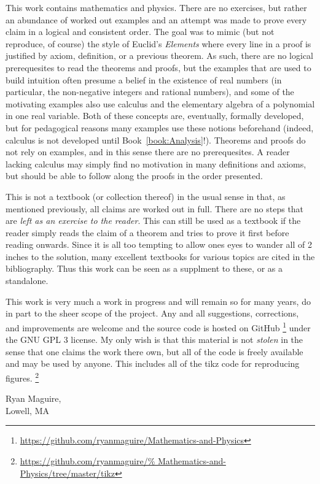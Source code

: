 This work contains mathematics and physics. There are no exercises, but rather
an abundance of worked out examples and an attempt was made to prove
every claim in a logical and consistent order. The goal was to mimic (but not
reproduce, of course) the style of Euclid's \textit{Elements} where every line
in a proof is justified by axiom, definition, or a previous theorem. As such,
there are no logical prerequesites to read the theorems and proofs, but the
examples that are used to build intuition often presume a belief in the
existence of real numbers (in particular, the non-negative integers and rational
numbers), and some of the motivating examples also use calculus and the
elementary algebra of a polynomial in one real variable. Both of these concepts
are, eventually, formally developed, but for pedagogical reasons many
examples use these notions beforehand (indeed, calculus is not developed until
Book~\ref{book:Analysis}!). Theorems and proofs do not rely on examples, and in
this sense there are no prerequesites. A reader lacking calculus may simply
find no motivation in many definitions and axioms, but should be able to follow
along the proofs in the order presented.
\par\hfill\par
This is not a textbook (or collection thereof) in the usual sense in that, as
mentioned previously, all claims are worked out in full. There are no steps that
are \textit{left as an exercise to the reader}. This can still be used as a
textbook if the reader simply reads the claim of a theorem and tries to prove
it first before reading onwards. Since it is all too tempting to allow ones eyes
to wander all of 2 inches to the solution, many excellent textbooks for various
topics are cited in the bibliography. Thus this work can be seen as a supplment
to these, or as a standalone.
\par\hfill\par
This work is very much a work in progress and will remain so for many years, do
in part to the sheer scope of the project. Any and all suggestions, corrections,
and improvements are welcome and the source code is hosted on GitHub%
\footnote{\url{https://github.com/ryanmaguire/Mathematics-and-Physics}} under
the GNU GPL 3 license. My only wish is that this material is not
\textit{stolen} in the sense that one claims the work there own, but all of the
code is freely available and may be used by anyone. This includes all of the
tikz code for reproducing figures.%
\footnote{\url{https://github.com/ryanmaguire/%
               Mathematics-and-Physics/tree/master/tikz}}
\begin{flushright}
    Ryan Maguire,\\
    Lowell, MA\\
\end{flushright}